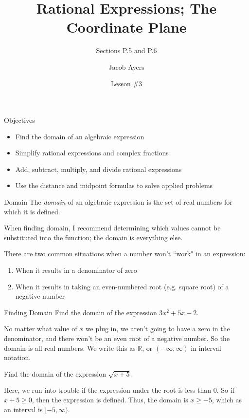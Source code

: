 \documentclass{beamer}
\title[P.5 and P.6]{Rational Expressions; The Coordinate Plane}
\subtitle{Sections P.5 and P.6}
\author{Jacob Ayers}
\institute{MAT 130} %
\date{Lesson \#3} %
\def\R{\mathbb{R}} %
\begin{document}
\begin{frame}
\titlepage
\end{frame}

\begin{frame}[t]{Objectives}
\begin{itemize}
	\item Find the domain of an algebraic expression
	\item Simplify rational expressions and complex fractions
	\item Add, subtract, multiply, and divide rational expressions
	\item Use the distance and midpoint formulas to solve applied problems
\end{itemize}
\end{frame}

\begin{frame}[t]{Domain}
The \textit{domain} of an algebraic expression is the set of real numbers for which it is defined. \vspace{6pt}

\pause

When finding domain, I recommend determining which values cannot be substituted into the function; the domain is everything else. \vspace{6pt}

\pause

There are two common situations when a number won't ``work" in an expression: \vspace{-4pt} \begin{enumerate}[1)]
\item When it results in a denominator of zero
\item When it results in taking an even-numbered root (e.g. square root) of a negative number
\end{enumerate}
\end{frame}

\begin{frame}[t]{Finding Domain}
Find the domain of the expression $3x^2 + 5x - 2$.

\pause No matter what value of $x$ we plug in, we aren't going to have a zero in the denominator, and there won't be an even root of a negative number. \pause So the domain is all real numbers. \pause We write this as $\R$, or $(-\infty, \infty)$ in interval notation. \vspace{18pt}

\pause

Find the domain of the expression $\sqrt{x+5}$.

\pause

Here, we run into trouble if the expression under the root is less than $0$. \pause So if $x + 5 \geq 0$, then the expression is defined. \pause Thus, the domain is $x \geq -5$, which as an interval is $[-5, \infty)$.
\end{frame}
\end{document}
